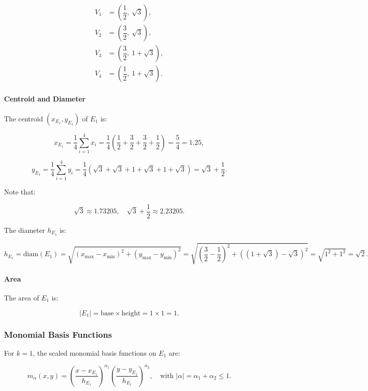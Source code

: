 \documentclass[class=article, crop=false]{standalone}
\begin{document}
\[
\begin{aligned}
V_1 &= \left( \dfrac{1}{2},\ \sqrt{3} \right), \\
V_2 &= \left( \dfrac{3}{2},\ \sqrt{3} \right), \\
V_3 &= \left( \dfrac{3}{2},\ 1 + \sqrt{3} \right), \\ 
V_4 &= \left( \dfrac{1}{2},\ 1 + \sqrt{3} \right).
\end{aligned}
\]

\paragraph{Centroid and Diameter}

The centroid \( (x_{E_1}, y_{E_1}) \) of \( E_1 \) is:

\[
x_{E_1} = \dfrac{1}{4} \sum_{i=1}^{4} x_i = \dfrac{1}{4} \left( \dfrac{1}{2} + \dfrac{3}{2} + \dfrac{3}{2} + \dfrac{1}{2} \right) = \dfrac{5}{4} = 1.25,
\]

\[
y_{E_1} = \dfrac{1}{4} \sum_{i=1}^{4} y_i = \dfrac{1}{4} \left( \sqrt{3} + \sqrt{3} + 1 + \sqrt{3} + 1 + \sqrt{3} \right) = \sqrt{3} + \dfrac{1}{2}.
\]

Note that:

\[
\sqrt{3} \approx 1.73205, \quad \sqrt{3} + \dfrac{1}{2} \approx 2.23205.
\]

The diameter \( h_{E_1} \) is:

\[
h_{E_1} = \text{diam}(E_1) = \sqrt{(x_{\max} - x_{\min})^2 + (y_{\max} - y_{\min})^2} = \sqrt{\left( \dfrac{3}{2} - \dfrac{1}{2} \right)^2 + \left( (1 + \sqrt{3}) - \sqrt{3} \right)^2} = \sqrt{1^2 + 1^2} = \sqrt{2}.
\]

\paragraph{Area}

The area of \( E_1 \) is:

\[
|E_1| = \text{base} \times \text{height} = 1 \times 1 = 1.
\]

\subsubsection{Monomial Basis Functions}

For \( k = 1 \), the scaled monomial basis functions on \( E_1 \) are:

\[
m_{\alpha}(x, y) = \left( \dfrac{x - x_{E_1}}{h_{E_1}} \right)^{\alpha_1} \left( \dfrac{y - y_{E_1}}{h_{E_1}} \right)^{\alpha_2}, \quad \text{with } |\alpha| = \alpha_1 + \alpha_2 \leq 1.
\]
\end{document}
